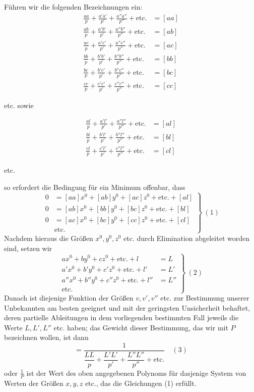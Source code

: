 Führen wir die folgenden Bezeichnungen ein:
\[
\begin{aligned}
\frac{aa}{p}+\frac{a'a'}{p'}+\frac{a''a''}{p''}+\text{etc.}&=[aa]\\[4pt]
\frac{ab}{p}+\frac{a'b'}{p'}+\frac{a''b''}{p''}+\text{etc.}&=[ab]\\[4pt]
\frac{ac}{p}+\frac{a'c'}{p'}+\frac{a''c''}{p''}+\text{etc.}&=[ac]\\[4pt]
\frac{bb}{p}+\frac{b'b'}{p'}+\frac{b''b''}{p''}+\text{etc.}&=[bb]\\[4pt]
\frac{bc}{p}+\frac{b'c'}{p'}+\frac{b''c''}{p''}+\text{etc.}&=[bc]\\[4pt]
\frac{cc}{p}+\frac{c'c'}{p'}+\frac{c''c''}{p''}+\text{etc.}&=[cc]
\end{aligned}
\]
\begin{center}etc. sowie\end{center}
\[
\begin{aligned}
\frac{al}{p}+\frac{a'l'}{p'}+\frac{a''l''}{p''}+\text{etc.}&=[al]\\[4pt]
\frac{bl}{p}+\frac{b'l'}{p'}+\frac{b''l''}{p''}+\text{etc.}&=[bl]\\[4pt]
\frac{cl}{p}+\frac{c'l'}{p'}+\frac{c''l''}{p''}+\text{etc.}&=[cl]
\end{aligned}
\]
\begin{center}etc.\end{center}
so erfordert die Bedingung für ein Minimum offenbar, dass
\[
\left.\begin{aligned}
0&=[aa]x^0+[ab]y^0+[ac]z^0+\text{etc.}+[al]\\
0&=[ab]x^0+[bb]y^0+[bc]z^0+\text{etc.}+[bl]\\
0&=[ac]x^0+[bc]y^0+[cc]z^0+\text{etc.}+[cl]\\
&\text{etc.}
\end{aligned}\right\}\ (1)
\]
Nachdem hieraus die Größen \(x^0,y^0,z^0\) etc. durch Elimination abgeleitet worden sind, setzen wir
\[
\left.\begin{aligned}
ax^0+by^0+cz^0+\text{etc.}+l&=L\\
a'x^0+b'y^0+c'z^0+\text{etc.}+l'&=L'\\
a''x^0+b''y^0+c''z^0+\text{etc.}+l''&=L''\\
\text{etc.}\quad&
\end{aligned}\right\}\ (2)
\]
Danach ist diejenige Funktion der Größen \(v,v',v''\) etc. zur Bestimmung unserer Unbekannten am besten geeignet und mit der geringsten Unsicherheit behaftet, deren partielle Ableitungen in dem vorliegenden bestimmten Fall jeweils die Werte \(L,L',L''\) etc. haben; das Gewicht dieser Bestimmung, das wir mit \(P\) bezeichnen wollen, ist dann
\[
=\frac{1}{\dfrac{LL}{p}+\dfrac{L'L'}{p'}+\dfrac{L''L''}{p''}+\text{etc.}}\quad(3)
\]
oder \(\frac1P\) ist der Wert des oben angegebenen Polynoms für dasjenige System von Werten der Größen \(x,y,z\) etc., das die Gleichungen (1) erfüllt.

